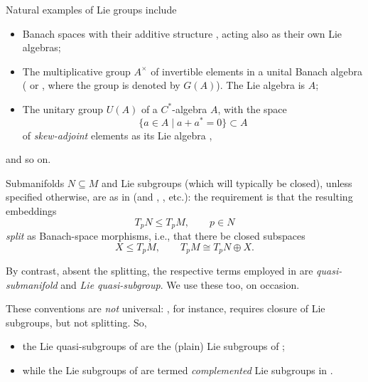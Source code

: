 \documentclass[10pt,a4paper]{amsart}
\numberwithin{equation}{section}
\begin{document}
Natural examples of Lie groups include
\begin{itemize}\itemsep=0pt
\item Banach spaces with their additive structure \cite[Section~III.1.1, Examples following Proposition 3]{bourb-lie-13}, acting also as their own Lie algebras;
\item The multiplicative group $A^{\times}$ of invertible elements in a unital Banach algebra (\cite[Proposition IV.9]{neeb-inf} or \cite[Example 6.9]{upm-ban}, where the group is denoted by $G(A)$). The Lie algebra is $A$;
\item The unitary group $U(A)$ of a $C^*$-algebra $A$, with the space
 \begin{equation*}
 \{a\in A\mid a+a^*=0\}\subset A
 \end{equation*}
 of {\it skew-adjoint} elements as its Lie algebra \cite[Corollary~15.22]{upm-ban},
\end{itemize}
and so on.

\begin{Convention}\label{cv:qlie}
 Submanifolds $N\subseteq M$ and Lie subgroups (which will typically be closed), unless specified otherwise, are as in \cite[Section~5.8.3]{bourb-vars-17} (and \cite[Section~III.1.3, Definition~3]{bourb-lie-13}, \cite[Section~II.2]{lang-fund}, etc.): the requirement is that the resulting embeddings
 \begin{equation*}
 T_pN\le T_pM,\qquad p\in N
 \end{equation*}
 {\it split} as Banach-space morphisms, i.e., that there be closed subspaces
 \begin{equation*}
 X\le T_pM,\qquad T_pM\cong T_pN\oplus X.
 \end{equation*}

 By contrast, absent the splitting, the respective terms employed in \cite[Section~III.1.3, Remark]{bourb-lie-13} are {\it quasi-submanifold} and {\it Lie quasi-subgroup}. We use these too, on occasion.
\end{Convention}

\begin{Remark}
 These conventions are {\it not} universal: \cite[Definition IV.6]{neeb-inf}, for instance, requires closure of Lie subgroups, but not splitting. So,
 \begin{itemize}\itemsep=0pt
 \item the Lie quasi-subgroups of \cite[Section~III.1.3, Remark]{bourb-lie-13} are the (plain) Lie subgroups of \cite[Definition IV.6]{neeb-inf};
 \item while the Lie subgroups of \cite[Section~III.1.3, Definition 3]{bourb-lie-13} are termed {\it complemented} Lie subgroups in \cite[Definition IV.6]{neeb-inf}.
 \end{itemize}
\end{Remark}
\end{document}
